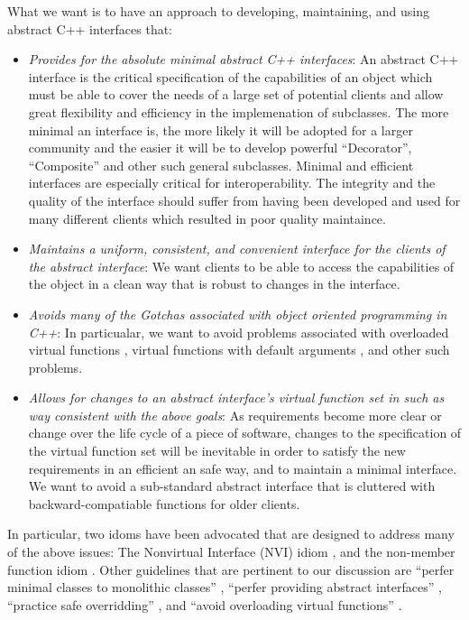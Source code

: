 \documentclass[pdf,ps2pdf,11pt]{SANDreport}
\begin{document}
What we want is to have an approach to developing, maintaining, and using
abstract C++ interfaces that:

\begin{itemize}

{}\item\textit{Provides for the absolute minimal abstract C++ interfaces}: An
abstract C++ interface is the critical specification of the capabilities of an
object which must be able to cover the needs of a large set of potential
clients and allow great flexibility and efficiency in the implemenation of
subclasses.  The more minimal an interface is, the more likely it will be
adopted for a larger community and the easier it will be to develop powerful
``Decorator'', ``Composite'' and other such general subclasses.  Minimal and
efficient interfaces are especially critical for interoperability.  The
integrity and the quality of the interface should suffer from having been
developed and used for many different clients which resulted in poor quality
maintaince.

{}\item\textit{Maintains a uniform, consistent, and convenient interface for
the clients of the abstract interface}: We want clients to be able to access
the capabilities of the object in a clean way that is robust to changes in the
interface.

{}\item\textit{Avoids many of the Gotchas associated with object oriented
programming in C++}: In particualar, we want to avoid problems associated with
overloaded virtual functions {}\cite[Item ???]{C++Gotchas???}, virtual
functions with default arguments {}\cite[Item ???]{C++Gotchas???}, and other
such problems.

{}\item\textit{Allows for changes to an abstract interface's virtual function
set in such as way consistent with the above goals}: As requirements become
more clear or change over the life cycle of a piece of software, changes to
the specification of the virtual function set will be inevitable in order to
satisfy the new requirements in an efficient an safe way, and to maintain a
minimal interface.  We want to avoid a sub-standard abstract interface that is
cluttered with backward-compatiable functions for older clients.

\end{itemize}

In particular, two idoms have been advocated that are designed to address many
of the above issues: The Nonvirtual Interface (NVI) idiom {}\cite[Item
39]{C++CodingStandards05}, and the non-member function idiom {}\cite[Item
44]{C++CodingStandards05}.  Other guidelines that are pertinent to our
discussion are ``perfer minimal classes to monolithic classes'' {}\cite[Item
33]{C++CodingStandards05}, ``perfer providing abstract interfaces''
{}\cite[Item 36]{C++CodingStandards05}, ``practice safe overridding''
{}\cite[Item 38]{C++CodingStandards05} {}\cite[Gotcha 74]{C++Gotchas03}, and
``avoid overloading virtual functions'' {}\cite[Gotcha 73]{C++Gotchas03}.
\end{document}
